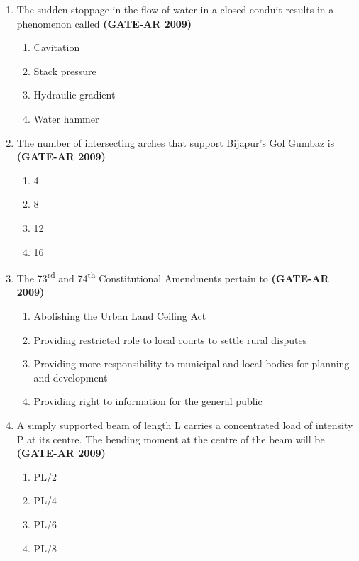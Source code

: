 \documentclass[a4paper,10pt]{article}
\begin{document}
\begin{enumerate}
    \item The sudden stoppage in the flow of water in a closed conduit results in a phenomenon called \hfill \textbf{(GATE-AR 2009)}
    \begin{multicols}{2}
	\begin{enumerate}
        \item Cavitation
        \item Stack pressure
        \item Hydraulic gradient
        \item Water hammer
    \end{enumerate}
	\end{multicols}

    \item The number of intersecting arches that support Bijapur’s Gol Gumbaz is \hfill \textbf{(GATE-AR 2009)}
    \begin{multicols}{4}
	\begin{enumerate}
        \item 4
        \item 8
        \item 12
        \item 16
    \end{enumerate}
	\end{multicols}
    
    \item The 73\textsuperscript{rd} and 74\textsuperscript{th} Constitutional Amendments pertain to \hfill \textbf{(GATE-AR 2009)}
    \begin{enumerate}
        \item Abolishing the Urban Land Ceiling Act
        \item Providing restricted role to local courts to settle rural disputes
        \item Providing more responsibility to municipal and local bodies for planning and development
        \item Providing right to information for the general public
    \end{enumerate}
    
    \item A simply supported beam of length L carries a concentrated load of intensity P at its centre. The bending moment at the centre of the beam will be \hfill \textbf{(GATE-AR 2009)}
    \begin{multicols}{4}
	\begin{enumerate}
        \item PL/2
        \item PL/4
        \item PL/6
        \item PL/8
    \end{enumerate}
	\end{multicols}


\end{enumerate}
\end{document}
